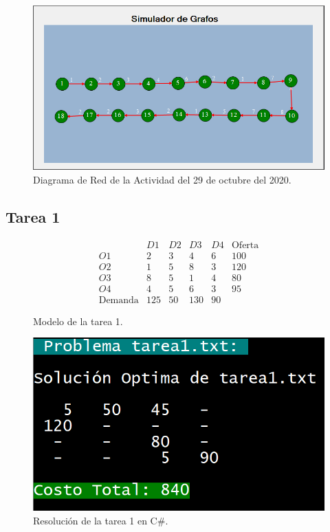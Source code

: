 \documentclass[a4paper, 12pt]{article}
\begin{document}
    \begin{figure}[H]
        \centering
        \includegraphics[width=12cm]{act29p2.PNG}
        \caption{Diagrama de Red de la Actividad del 29 de octubre del 2020.}
    \end{figure}
    \subsection{Tarea 1}
    \begin{figure}[H]
        \[\begin{matrix}
            &D1&D2&D3&D4&\text{Oferta}\\
        O1&2&3&4&6&100\\
        O2&1&5&8&3&120\\
        O3&8&5&1&4&80\\
        O4&4&5&6&3&95\\
        \text{Demanda}&125&50&130&90
        \end{matrix}\]
        \caption{Modelo de la tarea 1.}
    \end{figure}
    \begin{figure}[H]
        \centering
        \includegraphics[width=12cm]{tarea1U2.PNG}
        \caption{Resolución de la tarea 1 en C\#.}
    \end{figure}
\end{document}
